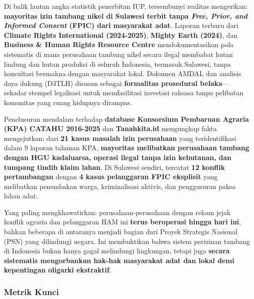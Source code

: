 \documentclass[
]{article}
\begin{document}
Di balik lautan angka statistik penerbitan IUP, tersembunyi realitas
mengerikan: \textbf{mayoritas izin tambang nikel di Sulawesi terbit
tanpa \emph{Free, Prior, and Informed Consent} (FPIC) dari masyarakat
adat}. Laporan terbaru dari \textbf{Climate Rights International
(2024-2025)}, \textbf{Mighty Earth (2024)}, dan \textbf{Business \&
Human Rights Resource Centre} mendokumentasikan pola sistematis di mana
perusahaan tambang nikel secara ilegal membabat hutan lindung dan hutan
produksi di seluruh Indonesia, termasuk Sulawesi, tanpa konsultasi
bermakna dengan masyarakat lokal. Dokumen AMDAL dan analisis daya dukung
(D3TLH) disusun sebagai \textbf{formalitas prosedural belaka}---sekadar
stempel legalisasi untuk memfasilitasi investasi raksasa tanpa pelibatan
komunitas yang ruang hidupnya dirampas.

Penelusuran mendalam terhadap \textbf{database Konsorsium Pembaruan
Agraria (KPA) CATAHU 2016-2025} dan \textbf{Tanahkita.id} mengungkap
fakta mengejutkan: dari \textbf{21 kasus masalah izin perusahaan} yang
teridentifikasi dalam 9 laporan tahunan KPA, \textbf{mayoritas
melibatkan perusahaan tambang dengan HGU kadaluarsa, operasi ilegal
tanpa izin kehutanan, dan tumpang tindih klaim lahan}. Di Sulawesi
sendiri, tercatat \textbf{12 konflik pertambangan} dengan \textbf{4
kasus pelanggaran FPIC eksplisit} yang melibatkan penembakan warga,
kriminalisasi aktivis, dan penggusuran paksa lahan adat.

Yang paling mengkhawatirkan: perusahaan-perusahaan dengan rekam jejak
konflik agraria dan pelanggaran HAM ini \textbf{terus beroperasi hingga
hari ini}, bahkan beberapa di antaranya menjadi bagian dari Proyek
Strategis Nasional (PSN) yang dilindungi negara. Ini membuktikan bahwa
sistem perizinan tambang di Indonesia bukan hanya gagal melindungi
lingkungan, tetapi juga \textbf{secara sistematis mengorbankan hak-hak
masyarakat adat dan lokal demi kepentingan oligarki ekstraktif}.

\subsubsection{Metrik Kunci}\label{metrik-kunci}
\end{document}
